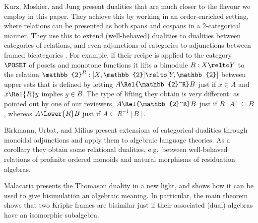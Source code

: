 \documentclass[10pt,a4paper]{article}
\begin{document}
Kurz, Moshier, and Jung \cite{kurz_2023} present dualities that are
much closer to the flavour we employ in this paper. They achieve this
by working in an order-enriched setting, where relations can be
presented as both spans and cospans in a 2-categorical manner. They
use this to extend (well-behaved) dualities to dualities between
categories of relations, and even adjunctions of categories to
adjunctions between framed bicategories \cite{shulman_2008}. For
example, if their recipe is applied to the category $\POSET$ of posets
and monotone functions it lifts a bimodule $R : X \relto Y$ to the
relation $\mathbb{2}^R : [X, \mathbb{2}] \relto [Y, \mathbb{2}]$
between upper sets that is defined by letting $A \Rel{\mathbb{2}^R} B$
just if $x \in A$ and $x \Rel{R} y$ implies $y \in B$. The type of
lifting they obtain is very different: as pointed out by one of our
reviewers, $A \Rel{\mathbb{2}^R} B$ just if $R[A] \subseteq B$,
whereas $A \Lower{R} B$ just if $A \subseteq R^{-1}[B]$.

Birkmann, Urbat, and Milius \cite{birkmann_2024} present extensions of
categorical dualities through monoidal adjunctions and apply them to algebraic
language theories. As a corollary they obtain some relational dualities, e.g.\
between well-behaved relations of profinite ordered monoids and natural
morphisms of residuation algebras.

Malacaria \cite{malacaria_1995} presents the Thomason duality in a new light,
and shows how it can be used to give bisimulation an algebraic meaning. In
particular, the main theorem shows that two Kripke frames are bisimilar just if
their associated (dual) algebras have an isomorphic subalgebra.

\end{document}

